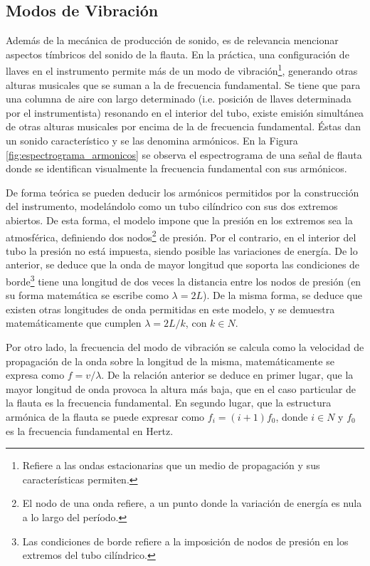 \documentclass
  [ams,pdfout]%
	{aeslac}
\begin{document}
\subsection*{Modos de Vibración}

Además de la mecánica de producción de sonido, es de relevancia mencionar aspectos tímbricos del sonido de la flauta. En la práctica, una configuración de llaves en el instrumento permite más de un modo de vibración\footnote{Refiere a las ondas estacionarias que un medio de propagación y sus características permiten.}, generando otras alturas musicales que se suman a la de frecuencia fundamental. Se tiene que para una columna de aire con largo determinado (i.e. posición de llaves determinada por el instrumentista) resonando en el interior del tubo, existe emisión simultánea de otras alturas musicales por encima de la de frecuencia fundamental. Éstas dan un sonido característico y se las denomina armónicos. En la Figura \ref{fig:espectrograma_armonicos} se observa el espectrograma de una señal de flauta donde se identifican visualmente la frecuencia fundamental con sus armónicos.


De forma teórica se pueden deducir los armónicos permitidos por la construcción del instrumento, modelándolo como un tubo cilíndrico con sus dos extremos abiertos. De esta forma, el modelo impone que la presión en los extremos sea la atmosférica, definiendo dos nodos\footnote{El nodo de una onda refiere, a un punto donde la variación de energía es nula a lo largo del período.} de presión. Por el contrario, en el interior del tubo la presión no está impuesta, siendo posible las variaciones de energía. De lo anterior, se deduce que la onda de mayor longitud que soporta las condiciones de borde\footnote{Las condiciones de borde refiere a la imposición de nodos de presión en los extremos del tubo cilíndrico.} tiene una longitud de dos veces la distancia entre los nodos de presión (en su forma matemática se escribe como $\lambda=2L$). De la misma forma, se deduce que existen otras longitudes de onda permitidas en este modelo, y se demuestra matemáticamente que cumplen $\lambda=2L/k$, con $k \in N$.

Por otro lado, la frecuencia del modo de vibración se calcula como la velocidad de propagación de la onda sobre la longitud de la misma, matemáticamente se expresa como $f=v/\lambda$. De la relación anterior se deduce en primer lugar, que la mayor longitud de onda provoca la altura más baja, que en el caso particular de la flauta es la frecuencia fundamental. En segundo lugar, que la estructura armónica de la flauta se puede expresar como $f_{i}=(i+1)f_{0}$, donde $i \in N$ y $f_{0}$ es la frecuencia fundamental en Hertz. 
\end{document}
